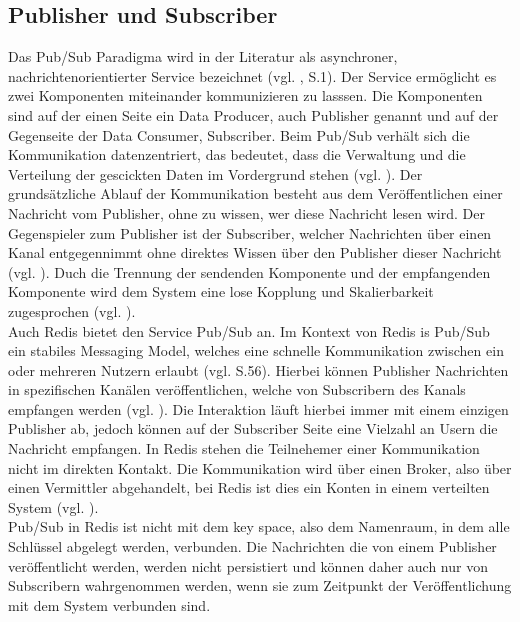
\subsection{Publisher und Subscriber}
\label{subsec:pubsub}

Das \acs{Pub/Sub} Paradigma wird in der Literatur als asynchroner, nachrichtenorientierter Service bezeichnet (vgl. \cite{XinZhang}, S.1). Der Service ermöglicht es zwei Komponenten miteinander kommunizieren zu lasssen. Die Komponenten sind auf der einen Seite ein Data Producer, auch Publisher genannt und auf der Gegenseite der Data Consumer, Subscriber.
Beim \acs{Pub/Sub} verhält sich die Kommunikation datenzentriert, das bedeutet, dass die Verwaltung und die Verteilung der gescickten Daten im Vordergrund stehen (vgl. \cite{Salehi2018}).
Der grundsätzliche Ablauf der Kommunikation besteht aus dem Veröffentlichen einer Nachricht vom Publisher, ohne zu wissen, wer diese Nachricht lesen wird. Der Gegenspieler zum Publisher ist der Subscriber, welcher Nachrichten über einen Kanal entgegennimmt ohne direktes Wissen über den Publisher dieser Nachricht (vgl. \cite{Salehi2018}).
Duch die Trennung der sendenden Komponente und der empfangenden Komponente wird dem System eine lose Kopplung und Skalierbarkeit zugesprochen (vgl. \cite{Salehi2018}).
\\
Auch \acs{Redis} bietet den Service \acs{Pub/Sub} an. Im Kontext von \acs{Redis} is \acs{Pub/Sub} ein stabiles Messaging Model, welches eine schnelle Kommunikation zwischen ein oder mehreren Nutzern erlaubt (vgl. \cite{Nelson2016} S.56).
Hierbei können Publisher Nachrichten in spezifischen Kanälen veröffentlichen, welche von Subscribern des Kanals empfangen werden (vgl. \cite{Redis-PubSub}). Die Interaktion läuft hierbei immer mit einem einzigen Publisher ab, jedoch können auf der Subscriber Seite eine Vielzahl an Usern die Nachricht empfangen.
In \acs{Redis} stehen die Teilnehemer einer Kommunikation nicht im direkten Kontakt. Die Kommunikation wird über einen Broker, also über einen Vermittler abgehandelt, bei \acs{Redis} ist dies ein Konten in einem verteilten System (vgl. \cite{Redis-PubSub}).
\\
\acs{Pub/Sub} in \acs{Redis} ist nicht mit dem key space, also dem Namenraum, in dem alle Schlüssel abgelegt werden, verbunden. Die Nachrichten die von einem Publisher veröffentlicht werden, werden nicht persistiert und können daher auch nur von Subscribern wahrgenommen werden, wenn sie zum Zeitpunkt der Veröffentlichung mit dem System verbunden sind. 

